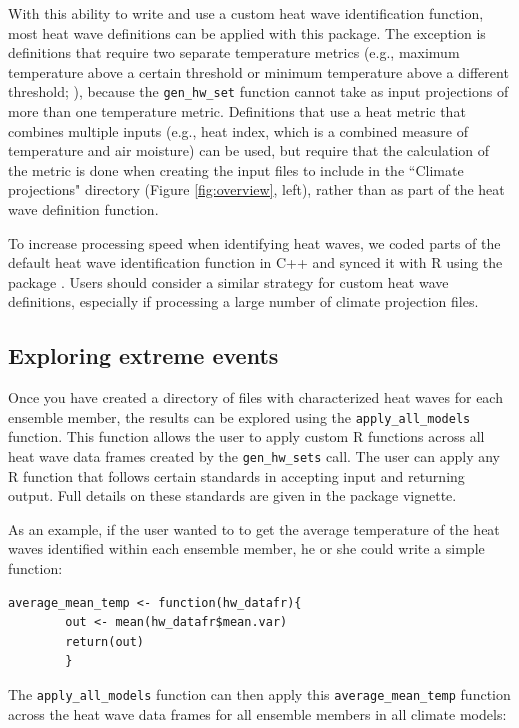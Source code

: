 With this ability to write and use a custom heat wave identification
function, most heat wave definitions can be applied with this package.
The exception is definitions that require two separate temperature
metrics (e.g., maximum temperature above a certain threshold or minimum
temperature above a different threshold;
\citet{kent2014heat, robinson2001definition}), because the
\texttt{gen\_hw\_set} function cannot take as input projections of more
than one temperature metric. Definitions that use a heat metric that
combines multiple inputs (e.g., heat index, which is a combined measure
of temperature and air moisture) can be used, but require that the
calculation of the metric is done when creating the input files to
include in the ``Climate projections" directory (Figure
\ref{fig:overview}, left), rather than as part of the heat wave
definition function.

To increase processing speed when identifying heat waves, we coded parts
of the default heat wave identification function in C++ and synced it
with R using the  package \citep{Rcpp}. Users should
consider a similar strategy for custom heat wave definitions, especially
if processing a large number of climate projection files.

\subsection{Exploring extreme events}\label{exploring-extreme-events}

Once you have created a directory of files with characterized heat waves
for each ensemble member, the results can be explored using the
\texttt{apply\_all\_models} function. This function allows the user to
apply custom R functions across all heat wave data frames created by the
\texttt{gen\_hw\_sets} call. The user can apply any R function that
follows certain standards in accepting input and returning output. Full
details on these standards are given in the 
package vignette.

As an example, if the user wanted to to get the average temperature of
the heat waves identified within each ensemble member, he or she could
write a simple function:

\begin{verbatim}
average_mean_temp <- function(hw_datafr){
        out <- mean(hw_datafr$mean.var)
        return(out)
        }
\end{verbatim}

\noindent The \texttt{apply\_all\_models} function can then apply this
\texttt{average\_mean\_temp} function across the heat wave data frames
for all ensemble members in all climate models:

